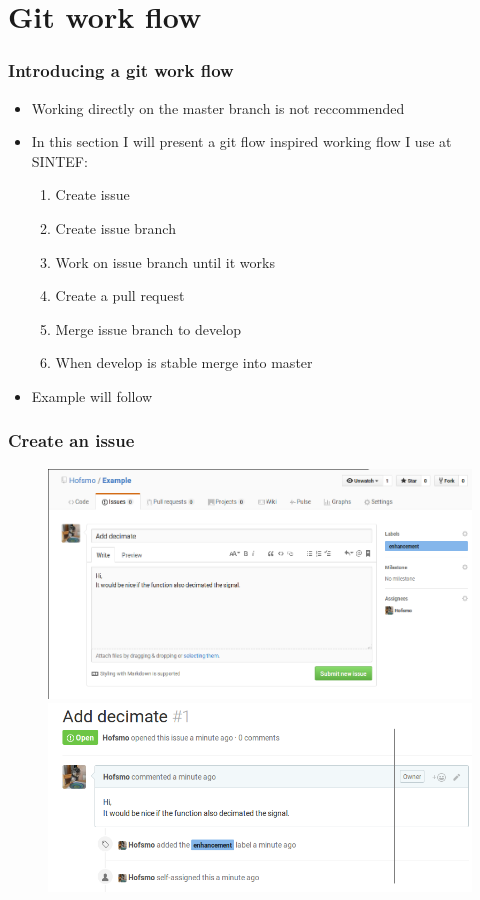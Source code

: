 \section[Git work flow]{Git work flow}
\begin{frame}
	\frametitle{Introducing a git work flow}
	\begin{itemize}[<+->]
		\item Working directly on the master branch is not reccommended
		\item In this section I will present a git flow inspired working flow I use at SINTEF:
		\begin{enumerate}[<+->]
			\item Create issue
			\item Create issue branch
			\item Work on issue branch until it works
			\item Create a pull request
			\item Merge issue branch to develop
			\item When develop is stable merge into master
		\end{enumerate}
		\item Example will follow 
	\end{itemize}
\end{frame}
\begin{frame}
	\frametitle{Create an issue}
	\begin{figure}
		\centering
		\begin{overprint}
			\includegraphics[width=\textwidth]{./pictures/create_issue.png}
			\onslide<2>\includegraphics[width=\textwidth]{./pictures/added_issue.png}
		\end{overprint}
	\end{figure}
\end{frame}
